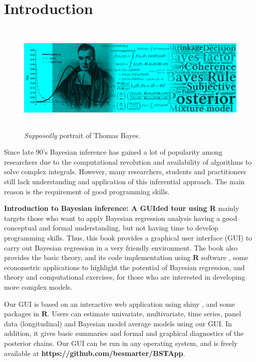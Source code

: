 \chapter*{Introduction}
\begin{figure}[h]
	\includegraphics[width=340pt, height=150pt]{frontmatter/figures/BannerBook.jpg}
	\caption[List of figure caption goes here]{\textit{Supposedly} portrait of Thomas Bayes.}\label{fig01}
\end{figure}

Since late 90’s Bayesian inference has gained a lot of popularity among researchers due to the computational revolution and availability of algorithms to solve complex integrals. However, many researchers, students and practitioners still lack understanding and application of this inferential approach. The main reason is the requirement of good programming skills.

\textbf{Introduction to Bayesian inference: A GUIded tour using R} mainly targets those who want to apply Bayesian regression analysis having a good conceptual and formal understanding, but not having time to develop programming skills. Thus, this book provides a graphical user interface (GUI) to carry out Bayesian regression in a very friendly environment. The book also provides the basic theory, and its code implementation using \textbf{R} software \cite{R2021}, some econometric applications to highlight the potential of Bayesian regression, and theory and computational exercises, for those who are interested in developing more complex models.

Our GUI is based on an interactive web application using shiny \cite{Chang2018}, and some packages in \textbf{R}. Users can estimate univariate, multivariate, time series, panel data (longitudinal) and Bayesian model average models using our GUI. In addition, it gives basic summaries and formal and graphical diagnostics of the posterior chains. Our GUI can be run in any operating system, and is freely available at \textbf{https://github.com/besmarter/BSTApp}. 

